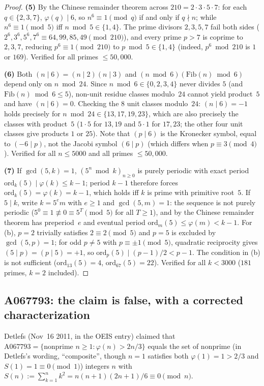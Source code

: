 \documentclass[11pt]{article}
\begin{document}
\begin{proof}
\textbf{(5)} By the Chinese remainder theorem across $210 = 2 \cdot 3 \cdot 5 \cdot 7$: for each $q \in \{2,3,7\}$, $\varphi(q) \mid 6$, so $n^6 \equiv 1 \pmod{q}$ if and only if $q \nmid n$; while $n^6 \equiv 1 \pmod{5}$ iff $n \bmod 5 \in \{1,4\}$. The prime divisors $2,3,5,7$ fail both sides ($2^6, 3^6, 5^6, 7^6 \equiv 64, 99, 85, 49 \pmod{210}$), and every prime $p > 7$ is coprime to $2,3,7$, reducing $p^6 \equiv 1 \pmod{210}$ to $p \bmod 5 \in \{1,4\}$ (indeed, $p^6 \bmod 210$ is $1$ or $169$). Verified for all primes $\le 50{,}000$.

\textbf{(6)} Both $(n \mid 6) = (n \mid 2)(n \mid 3)$ and $(n \bmod 6)(\mathrm{Fib}(n) \bmod 6)$ depend only on $n \bmod 24$. Since $n \bmod 6 \in \{0,2,3,4\}$ never divides $5$ (and $\mathrm{Fib}(n) \bmod 6 \le 5$), non-unit residue classes modulo~$24$ cannot yield product~$5$ and have $(n \mid 6) = 0$. Checking the $8$ unit classes modulo~$24$: $(n \mid 6) = -1$ holds precisely for $n \bmod 24 \in \{13, 17, 19, 23\}$, which are also precisely the classes with product~$5$ ($1\cdot 5$ for $13,19$ and $5\cdot 1$ for $17,23$; the other four unit classes give products $1$ or $25$). Note that $(p \mid 6)$ is the Kronecker symbol, equal to $(-6 \mid p)$, not the Jacobi symbol $(6 \mid p)$ (which differs when $p \equiv 3 \pmod{4}$). Verified for all $n \le 5000$ and all primes $\le 50{,}000$.

\textbf{(7)} If $\gcd(5,k) = 1$, $(5^n \bmod k)_{n \ge 0}$ is purely periodic with exact period $\mathrm{ord}_k(5) \mid \varphi(k) \le k-1$; period $k-1$ therefore forces $\mathrm{ord}_k(5) = \varphi(k) = k-1$, which holds iff $k$ is prime with primitive root~$5$. If $5 \mid k$, write $k = 5^e m$ with $e \ge 1$ and $\gcd(5,m) = 1$: the sequence is not purely periodic ($5^0 \equiv 1 \not\equiv 0 \equiv 5^T \pmod{5}$ for all $T \ge 1$), and by the Chinese remainder theorem has preperiod~$e$ and eventual period $\mathrm{ord}_m(5) \le \varphi(m) < k-1$. For (b), $p = 2$ trivially satisfies $2 \equiv 2 \pmod{5}$ and $p = 5$ is excluded by $\gcd(5,p) = 1$; for odd $p \ne 5$ with $p \equiv \pm 1 \pmod{5}$, quadratic reciprocity gives $(5 \mid p) = (p \mid 5) = +1$, so $\mathrm{ord}_p(5) \mid (p-1)/2 < p-1$. The condition in (b) is not sufficient ($\mathrm{ord}_{13}(5) = 4$, $\mathrm{ord}_{67}(5) = 22$). Verified for all $k < 3000$ ($181$ primes, $k=2$ included).
\end{proof}

\subsection{A067793: the claim is false, with a corrected
characterization}
\label{sec:a067793}
Detlefs (Nov~16 2011, in the OEIS entry) claimed that $\text{A067793} = \{\text{nonprime } n \ge 1 : \varphi(n) > 2n/3\}$ equals the set of nonprime (in Detlefs's wording, ``composite'', though $n=1$ satisfies both $\varphi(1) = 1 > 2/3$ and $S(1) = 1 \equiv 0 \pmod{1}$) integers $n$ with $S(n) := \sum_{k=1}^{n} k^2 = n(n+1)(2n+1)/6 \equiv 0 \pmod{n}$.
\end{document}
